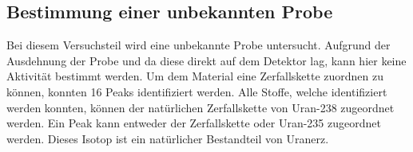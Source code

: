 \subsection{Bestimmung einer unbekannten Probe}
Bei diesem Versuchsteil wird eine unbekannte Probe untersucht. Aufgrund der Ausdehnung der Probe und da diese direkt auf dem Detektor
lag, kann hier keine Aktivität bestimmt werden.
Um dem Material eine Zerfallskette zuordnen zu können, konnten 16 Peaks identifiziert werden. Alle Stoffe, welche identifiziert 
werden konnten, können der natürlichen Zerfallskette von Uran-238 zugeordnet werden. Ein Peak kann entweder der Zerfallskette 
oder Uran-235 zugeordnet werden. Dieses Isotop ist ein natürlicher Bestandteil von Uranerz. 